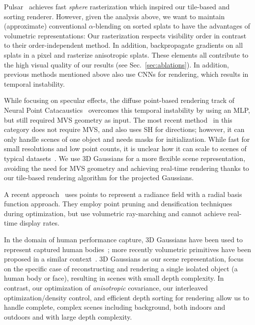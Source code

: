 Pulsar~\cite{Lassner_2021_CVPR} achieves fast \emph{sphere} rasterization which inspired our tile-based and sorting renderer. However, given the analysis above, we want to maintain (approximate) conventional $\alpha$-blending on sorted splats to have the advantages of volumetric representations: Our rasterization respects visibility order in contrast to their order-independent method. In addition,
 backpropagate gradients on all splats in a pixel and rasterize anisotropic splats.
These elements all contribute to the high visual quality of our results (see Sec.~\ref{sec:ablations}).
In addition,
previous methods mentioned above
also use CNNs for rendering, which results in temporal instability.

While focusing on specular effects, the diffuse point-based rendering track of Neural Point Catacaustics~\cite{kopanas22} overcomes this temporal instability by using an MLP, but still required MVS geometry as input.
The most recent method~\cite{zhang2022} in this category does not require MVS, and also uses SH for directions; however, it can only handle scenes of one object and needs masks for initialization. While fast for small resolutions and low point counts, it is unclear how it can scale to scenes of typical datasets~\cite{knapitsch2017tanks,hedman2018deep,barron2022mipnerf360}.
We use 3D Gaussians for a more flexible scene representation, avoiding the need for MVS geometry and achieving real-time rendering thanks to our tile-based rendering algorithm for the projected Gaussians.





A recent approach~\cite{xu2022point} uses points to represent a radiance field with a radial basis function approach. They employ point pruning and densification techniques during optimization, but use volumetric ray-marching and cannot achieve real-time display rates. %


In the domain of human performance capture, 3D Gaussians have been used to represent captured human bodies~\cite{stoll2011fast,rhodin2015versatile}; more recently   volumetric primitives have been proposed in a similar context~\cite{lombardi2021mixture}.  3D Gaussians as our scene representation,  focus on the specific case of reconstructing and rendering a single isolated object (a human body or face), resulting in scenes with small depth complexity. In contrast, our optimization of \emph{anisotropic} covariance, our interleaved optimization/density control, and efficient depth sorting for rendering allow us to handle complete, complex scenes including background, both indoors and outdoors and with large depth complexity.
